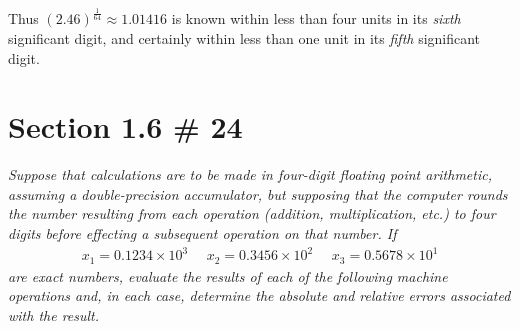 \documentclass[12pt]{article}
\begin{document}
\noindent Thus $(2.46)^{\frac{1}{64}} \approx 1.01416$ is known within less than four units in its {\it sixth} significant digit, and certainly within less than one unit in its {\it fifth} significant digit.

\pagebreak
\section*{Section 1.6 \# 24}
{\it Suppose that calculations are to be made in four-digit floating point arithmetic, assuming a double-precision accumulator, but supposing that the computer rounds the number resulting from each operation (addition, multiplication, etc.) to four digits before effecting a subsequent operation on that number.  If} 
\begin{align*}
x_1 = 0.1234 \times 10^3 \ \ \ \ \ \ x_2 = 0.3456 \times 10^2 \ \ \ \ \ \ x_3 = 0.5678 \times 10^1
\end{align*}
{\it are exact numbers, evaluate the results of each of the following machine operations and, in each case, determine the absolute and relative errors associated with the result.} \\
\end{document}
